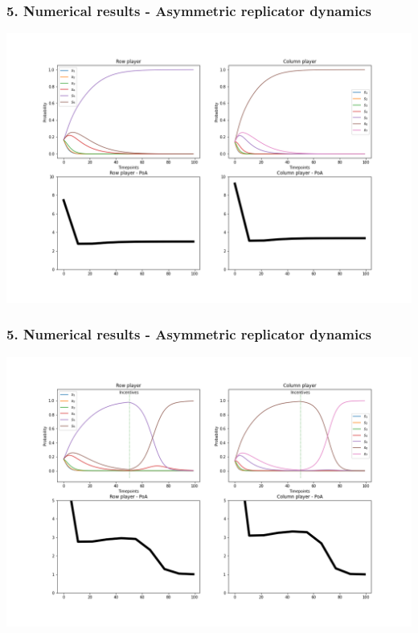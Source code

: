 \begin{frame}
    \frametitle{5. Numerical results - Asymmetric replicator dynamics}

    \includegraphics[scale=0.28]{Bin/ard_plots/ARD_game.png}
\end{frame}



\begin{frame}
    \frametitle{5. Numerical results - Asymmetric replicator dynamics}

    \includegraphics[scale=0.28]{Bin/ard_plots/ARD_penalty_game.png}
    
\end{frame}


